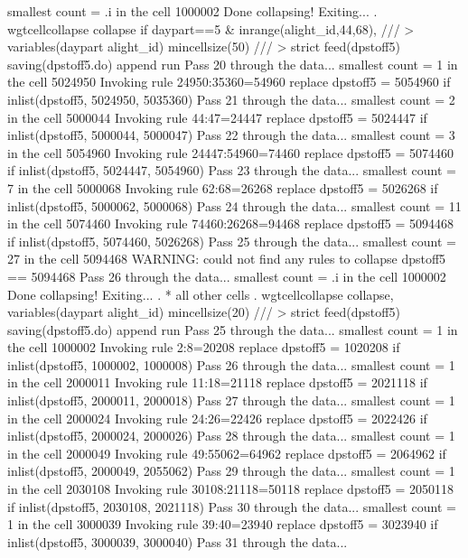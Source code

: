   smallest count = .i in the cell      1000002
  Done collapsing! Exiting...
{\smallskip}
. wgtcellcollapse collapse if daypart==5 \& inrange(alight_id,44,68), ///
>         variables(daypart alight_id) mincellsize(50) ///
>         strict feed(dpstoff5) saving(dpstoff5.do) append run
Pass 20 through the data...
  smallest count = 1 in the cell      5024950
  Invoking rule 24950:35360=54960
  replace dpstoff5 = 5054960 if inlist(dpstoff5, 5024950, 5035360)
Pass 21 through the data...
  smallest count = 2 in the cell      5000044
  Invoking rule 44:47=24447
  replace dpstoff5 = 5024447 if inlist(dpstoff5, 5000044, 5000047)
Pass 22 through the data...
  smallest count = 3 in the cell      5054960
  Invoking rule 24447:54960=74460
  replace dpstoff5 = 5074460 if inlist(dpstoff5, 5024447, 5054960)
Pass 23 through the data...
  smallest count = 7 in the cell      5000068
  Invoking rule 62:68=26268
  replace dpstoff5 = 5026268 if inlist(dpstoff5, 5000062, 5000068)
Pass 24 through the data...
  smallest count = 11 in the cell      5074460
  Invoking rule 74460:26268=94468
  replace dpstoff5 = 5094468 if inlist(dpstoff5, 5074460, 5026268)
Pass 25 through the data...
  smallest count = 27 in the cell      5094468
  WARNING: could not find any rules to collapse dpstoff5 == 5094468
Pass 26 through the data...
  smallest count = .i in the cell      1000002
  Done collapsing! Exiting...
{\smallskip}
. * all other cells
. wgtcellcollapse collapse, variables(daypart alight_id) mincellsize(20) ///
>         strict feed(dpstoff5) saving(dpstoff5.do) append run
Pass 25 through the data...
  smallest count = 1 in the cell      1000002
  Invoking rule 2:8=20208
  replace dpstoff5 = 1020208 if inlist(dpstoff5, 1000002, 1000008)
Pass 26 through the data...
  smallest count = 1 in the cell      2000011
  Invoking rule 11:18=21118
  replace dpstoff5 = 2021118 if inlist(dpstoff5, 2000011, 2000018)
Pass 27 through the data...
  smallest count = 1 in the cell      2000024
  Invoking rule 24:26=22426
  replace dpstoff5 = 2022426 if inlist(dpstoff5, 2000024, 2000026)
Pass 28 through the data...
  smallest count = 1 in the cell      2000049
  Invoking rule 49:55062=64962
  replace dpstoff5 = 2064962 if inlist(dpstoff5, 2000049, 2055062)
Pass 29 through the data...
  smallest count = 1 in the cell      2030108
  Invoking rule 30108:21118=50118
  replace dpstoff5 = 2050118 if inlist(dpstoff5, 2030108, 2021118)
Pass 30 through the data...
  smallest count = 1 in the cell      3000039
  Invoking rule 39:40=23940
  replace dpstoff5 = 3023940 if inlist(dpstoff5, 3000039, 3000040)
Pass 31 through the data...
